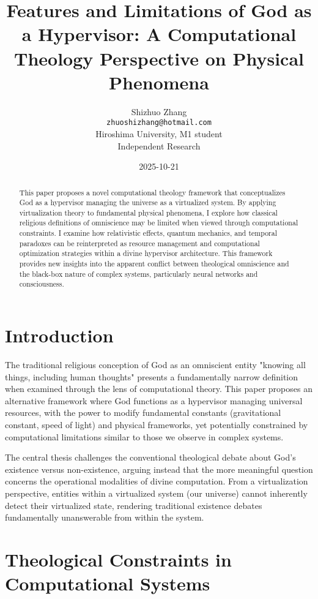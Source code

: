 \documentclass[12pt,a4paper]{article}
\title{Features and Limitations of God as a Hypervisor: A Computational Theology Perspective on Physical Phenomena}
\author{Shizhuo Zhang\\
\texttt{zhuoshizhang@hotmail.com}\\
Hiroshima University, M1 student\\
Independent Research}
\date{2025-10-21}
\begin{document}
\maketitle

\begin{abstract}
This paper proposes a novel computational theology framework that conceptualizes God as a hypervisor managing the universe as a virtualized system. By applying virtualization theory to fundamental physical phenomena, I explore how classical religious definitions of omniscience may be limited when viewed through computational constraints. I examine how relativistic effects, quantum mechanics, and temporal paradoxes can be reinterpreted as resource management and computational optimization strategies within a divine hypervisor architecture. This framework provides new insights into the apparent conflict between theological omniscience and the black-box nature of complex systems, particularly neural networks and consciousness.
\end{abstract}

\section{Introduction}

The traditional religious conception of God as an omniscient entity "knowing all things, including human thoughts" presents a fundamentally narrow definition when examined through the lens of computational theory. This paper proposes an alternative framework where God functions as a hypervisor managing universal resources, with the power to modify fundamental constants (gravitational constant, speed of light) and physical frameworks, yet potentially constrained by computational limitations similar to those we observe in complex systems.

The central thesis challenges the conventional theological debate about God's existence versus non-existence, arguing instead that the more meaningful question concerns the operational modalities of divine computation. From a virtualization perspective, entities within a virtualized system (our universe) cannot inherently detect their virtualized state, rendering traditional existence debates fundamentally unanswerable from within the system.

\section{Theological Constraints in Computational Systems}
\end{document}
